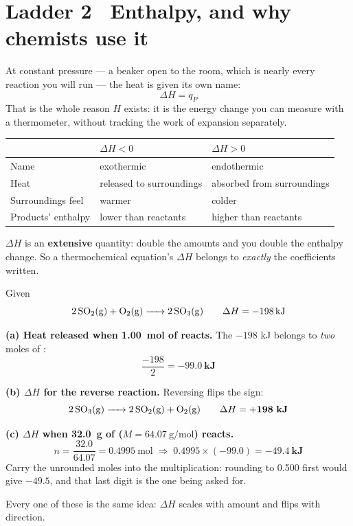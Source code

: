 \documentclass{apchem-worksheet}
\begin{document}
\section*{\sffamily Ladder 2 \textbullet\ Enthalpy, and why chemists use
it}

At constant pressure --- a beaker open to the room, which is nearly every
reaction you will run --- the heat is given its own name:
\[ \boxed{\;\Delta H = q_P\;} \]
That is the whole reason $H$ exists: it is the energy change you can
measure with a thermometer, without tracking the work of expansion
separately.

\begin{center}
\renewcommand{\arraystretch}{1.2}
\begin{tabular}{@{}lll@{}}
\hline
 & \textbf{$\Delta H < 0$} & \textbf{$\Delta H > 0$} \\
\hline
Name & exothermic & endothermic \\
Heat & released to surroundings & absorbed from surroundings \\
Surroundings feel & warmer & colder \\
Products' enthalpy & lower than reactants & higher than reactants \\
\hline
\end{tabular}
\end{center}

$\Delta H$ is an \textbf{extensive} quantity: double the amounts and you
double the enthalpy change. So a thermochemical equation's $\Delta H$
belongs to \emph{exactly} the coefficients written.

\begin{workedexample}
Given
\[ \ce{2SO2(g) + O2(g) -> 2SO3(g)} \qquad
   \Delta H = \SI{-198}{\kilo\joule} \]

\textbf{(a) Heat released when \SI{1.00}{\mole} of  reacts.} The
$-198$ kJ belongs to \emph{two} moles of :
\[ \frac{-198}{2} = \mathbf{-99.0~kJ} \]

\textbf{(b) $\Delta H$ for the reverse reaction.} Reversing flips the
sign:
\[ \ce{2SO3(g) -> 2SO2(g) + O2(g)} \qquad
   \Delta H = \mathbf{+198~kJ} \]

\textbf{(c) $\Delta H$ when \SI{32.0}{\gram} of 
($M = \SI{64.07}{\gram\per\mole}$) reacts.}
\[ n = \frac{32.0}{64.07} = \SI{0.4995}{\mole}
   \;\Rightarrow\; 0.4995 \times (-99.0) = \mathbf{-49.4~kJ} \]
Carry the unrounded moles into the multiplication: rounding to 0.500
first would give $-49.5$, and that last digit is the one being asked
for.

Every one of these is the same idea: $\Delta H$ scales with amount and
flips with direction.
\end{workedexample}
\end{document}
